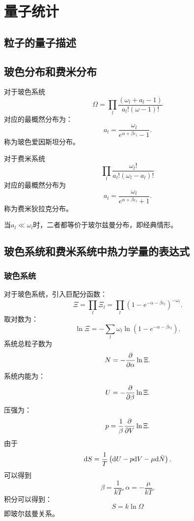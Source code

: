 \chapter{量子统计}
\section{粒子的量子描述}
\section{玻色分布和费米分布}
对于玻色系统
\begin{equation}
    \Omega=\prod_l\frac{(\omega_l+a_l-1)}{a_l!(\omega-1)!}
\end{equation}
对应的最概然分布为：
\begin{equation}
    a_l=\frac{\omega_l}{e^{\alpha+\beta\varepsilon_l}-1}.
\end{equation}
称为玻色爱因斯坦分布。


对于费米系统 
\begin{equation}
    \prod_l\frac{\omega_l!}{a_l!(\omega_l-a_l)!}
\end{equation}
对应的最概然分布为
\begin{equation}
    a_l=\frac{\omega_l}{e^{\alpha+\beta\varepsilon_l}+1}.
\end{equation}
称为费米狄拉克分布。

当$a_l\ll \omega_l$时，二者都等价于玻尔兹曼分布，即经典情形。

\section{玻色系统和费米系统中热力学量的表达式}
\subsection{玻色系统}
对于玻色系统，引入巨配分函数：
\begin{equation}
    \Xi=\prod_l\Xi_l=\prod_l\left(1-e^{-\alpha-\beta\varepsilon_l}\right)^{-\omega_l}.
\end{equation}
取对数为：
\begin{equation}
    \ln\Xi=-\sum_l\omega_l\ln(1-e^{-\alpha-\beta\varepsilon_l}).
\end{equation}
系统总粒子数为
\begin{equation}
    N=-\frac{\partial }{\partial \alpha}\ln\Xi.
\end{equation}
系统内能为：
\begin{equation}
    U=-\frac{\partial }{\partial \beta}\ln \Xi.
\end{equation}
压强为：
\begin{equation}
    p=\frac{1}{\beta}\frac{\partial }{\partial V}\ln\Xi.
\end{equation}
由于
\begin{equation}
    \mathrm{d} S=\frac{1}{T}\left(\mathrm{d} U-p\mathrm{d} V -\mu\mathrm{d}\bar{N}\right).
\end{equation}
可以得到
\begin{equation}
    \beta=\frac{1}{kT}, \alpha =-\frac{\mu}{kT}.
\end{equation}
积分可以得到：
\begin{equation}
    S=k\ln\Omega
\end{equation}
即玻尔兹曼关系。

